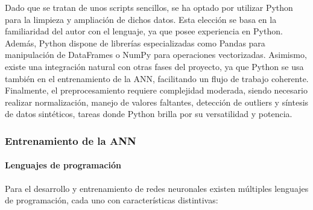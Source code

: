 Dado que se tratan de unos scripts sencillos, se ha optado por utilizar Python para la limpieza y ampliación de dichos datos. Esta elección se basa en la familiaridad del autor con el lenguaje, ya que posee experiencia en Python. Además, Python dispone de librerías especializadas como Pandas para manipulación de DataFrames o NumPy para operaciones vectorizadas. Asimismo, existe una integración natural con otras fases del proyecto, ya que Python se usa también en el entrenamiento de la ANN, facilitando un flujo de trabajo coherente. Finalmente, el preprocesamiento requiere complejidad moderada, siendo necesario realizar normalización, manejo de valores faltantes, detección de outliers y síntesis de datos sintéticos, tareas donde Python brilla por su versatilidad y potencia.
\par

\subsubsection{Entrenamiento de la ANN}

\paragraph{Lenguajes de programación}

Para el desarrollo y entrenamiento de redes neuronales existen múltiples lenguajes de programación, cada uno con características distintivas:

